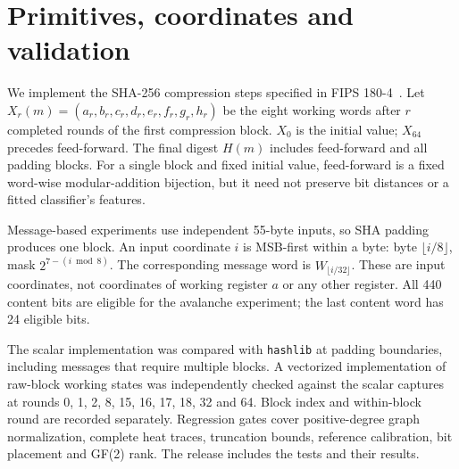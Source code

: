 \documentclass[11pt]{article}
\begin{document}
\section{Primitives, coordinates and validation}
We implement the SHA-256 compression steps specified in FIPS 180-4~\cite{nist}. Let $X_r(m)=(a_r,b_r,c_r,d_r,e_r,f_r,g_r,h_r)$ be the eight working words after $r$ completed rounds of the first compression block. $X_0$ is the initial value; $X_{64}$ precedes feed-forward. The final digest $H(m)$ includes feed-forward and all padding blocks. For a single block and fixed initial value, feed-forward is a fixed word-wise modular-addition bijection, but it need not preserve bit distances or a fitted classifier's features.

Message-based experiments use independent 55-byte inputs, so SHA padding produces one block. An input coordinate $i$ is MSB-first within a byte: byte $\lfloor i/8\rfloor$, mask $2^{7-(i\bmod8)}$. The corresponding message word is $W_{\lfloor i/32\rfloor}$. These are input coordinates, not coordinates of working register $a$ or any other register. All 440 content bits are eligible for the avalanche experiment; the last content word has 24 eligible bits.

The scalar implementation was compared with \texttt{hashlib} at padding boundaries, including messages that require multiple blocks. A vectorized implementation of raw-block working states was independently checked against the scalar captures at rounds 0, 1, 2, 8, 15, 16, 17, 18, 32 and 64. Block index and within-block round are recorded separately. Regression gates cover positive-degree graph normalization, complete heat traces, truncation bounds, reference calibration, bit placement and GF(2) rank. The release includes the tests and their results.
\end{document}
